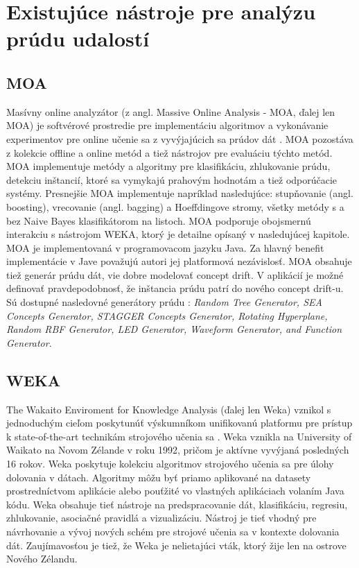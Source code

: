 \chapter{Existujúce nástroje pre analýzu prúdu udalostí}
\label{Existujúce nástroje pre analýzu prúdu udalostí} 

\section{MOA}
Masívny online analyzátor (z angl. Massive Online Analysis - MOA, ďalej len MOA) je softvérové prostredie pre implementáciu algoritmov a vykonávanie experimentov pre online učenie sa z vyvýjajúcich sa prúdov dát \citep{DBLP:journals/jmlr/BifetHKP10}. MOA pozostáva z kolekcie offline a online metód a tiež nástrojov pre evaluáciu týchto metód. MOA implementuje metódy a algoritmy pre klasifikáciu, zhlukovanie prúdu, detekciu inštancií, ktoré sa vymykajú prahovým hodnotám a tiež odporúčacie systémy. Presnejšie MOA implementuje napríklad nasledujúce: stupňovanie (angl. boosting), vrecovanie (angl. bagging) a Hoeffdingove stromy, všetky metódy s a bez Naive Bayes klasifikátorom na listoch. MOA podporuje obojsmernú interakciu s nástrojom WEKA, ktorý je detailne opísaný v nasledujúcej kapitole. \\

MOA je implementovaná v programovacom jazyku Java. Za hlavný benefit implementácie v Jave považujú autori jej platformová nezávislosť. MOA obsahuje tiež generár prúdu dát, vie dobre modelovať concept drift. V aplikácií je možné definovať pravdepodobnosť, že inštancia prúdu patrí do nového concept drift-u. Sú dostupné nasledovné generátory prúdu \citep{DBLP:journals/jmlr/BifetHKP10}: \textit{Random Tree Generator, SEA Concepts Generator, STAGGER Concepts Generator, Rotating Hyperplane, Random RBF Generator, LED Generator, Waveform Generator, and Function Generator}.
\label{fig:moa}

\section{WEKA}
The Wakaito Enviroment for Knowledge Analysis (ďalej len Weka) vznikol s jednoduchým cieľom poskytunúť výskumníkom unifikovanú platformu pre prístup k state-of-the-art technikám strojového učenia sa \citep{hall2009weka}. Weka vznikla na University of Waikato na Novom Zélande v roku 1992, pričom je aktívne vyvýjaná posledných 16 rokov. Weka poskytuje kolekciu algoritmov strojového učenia sa pre úlohy dolovania v dátach. Algoritmy môžu byť priamo aplikované na datasety prostredníctvom aplikácie alebo pouťžité vo vlastných aplikáciach volaním Java kódu. Weka obsahuje tieť nástroje na predspracovanie dát, klasifikáciu, regresiu, zhlukovanie, asociačné pravidlá a vizualizáciu. Nástroj je tieť vhodný pre návrhovanie a vývoj nových schém pre strojové učenia sa v kontexte dolovania dát. Zaujímavosťou je tiež, že Weka je nelietajúci vták, ktorý žije len na ostrove Nového Zélandu. \\

